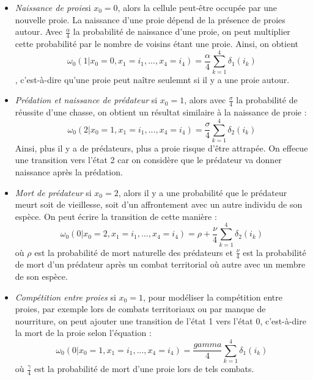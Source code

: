 \begin {itemize}
\item \textit{Naissance de proie}si $x_0=0$, alors la cellule peut-être occupée par une nouvelle proie. La naissance d'une proie dépend de la présence de proies autour. Avec $\frac{\alpha}{4}$ la probabilité de naissance d'une proie, on peut multiplier cette probabilité par le nombre de voisins étant une proie. Ainsi, on obtient \begin{equation}\omega_0(1|x_0=0, x_1=i_1, ..., x_4=i_4)=\frac{\alpha}{4}\sum_{k=1}^{4}\delta_{1}(i_k)\end{equation}, c'est-à-dire qu'une proie peut naître seulemnt si il y a une proie autour.


\item \textit{Prédation et naissance de prédateur} si $x_0=1$, alors avec $\frac{\sigma}{4}$ la probabilité de réussite d'une chasse, on obtient un résultat similaire à la naissance de proie :\begin{equation} \omega_0(2|x_0=1, x_1=i_1, ..., x_4=i_4)=\frac{\sigma}{4}\sum_{k=1}^{4}\delta_{2}(i_k)\end{equation} Ainsi, plus il y a de prédateurs, plus a proie risque d'être attrapée. On effecue une transition vers l'état 2 car on considère que le prédateur va donner naissance après la prédation.


\item \textit{Mort de prédateur}  si $x_0=2$, alors il y a une probabilité que le prédateur meurt soit de vieillesse, soit d'un affrontement avec un autre individu de son espèce. On peut écrire la transition de cette manière : \begin{equation}\omega_0(0|x_0=2, x_1=i_1, ..., x_4=i_4)=\rho + \frac{\nu}{4}\sum_{k=1}^{4}\delta_{2}(i_k)\end{equation} où $\rho$ est la probabilité de mort naturelle des prédateurs et $\frac{\nu}{4}$ est la probabilité de mort d'un prédateur après un combat territorial où autre avec un membre de son espèce. 


\item \textit{Compétition entre proies}  si $x_0=1$, pour modéliser la compétition entre proies, par exemple lors de combats territoriaux ou par manque de nourriture, on peut ajouter une transition de l'état 1 vers l'état 0, c'est-à-dire la mort de la proie selon l'équation : \begin{equation}\omega_0(0|x_0=1, x_1=i_1, ..., x_4=i_4)=\frac{gamma}{4}\sum_{k=1}^{4}\delta_{1}(i_k)\end{equation} où $\frac{\gamma}{4}$ est la probabilité de mort d'une proie lors de tels combats.

\end{itemize}

